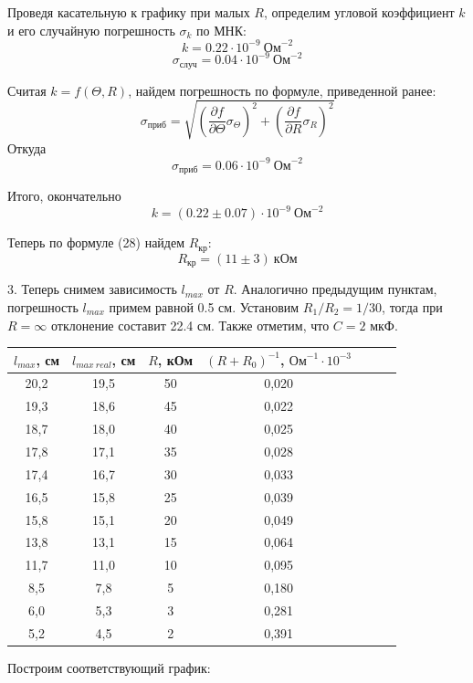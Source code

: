 \documentclass[14pt]{article}
\begin{document}
\vspace{1cm}
Проведя касательную к графику при малых $R$, определим угловой коэффициент $k$ и его случайную погрешность $\sigma_k$ по МНК:
$$
	k = 0.22 \cdot 10^{-9}~\text{Ом}^{-2}
$$
$$
	\sigma_{\text{случ}} = 0.04 \cdot 10^{-9}~\text{Ом}^{-2}
$$

Считая $k = f(\Theta, R)$, найдем погрешность по формуле, приведенной ранее:
$$
	\sigma_{\text{приб}} = \sqrt{\left(\frac{\partial f}{\partial \Theta}\sigma_\Theta\right)^2 + \left(\frac{\partial f}{\partial R}\sigma_R\right)^2}
$$
Откуда
$$
	\sigma_{\text{приб}} = 0.06 \cdot 10^{-9}~\text{Ом}^{-2}
$$

Итого, окончательно
$$
	k = (0.22 \pm 0.07) \cdot 10^{-9}~\text{Ом}^{-2}
$$

\vspace{1cm}
Теперь по формуле (28) найдем $R_\text{кр}$:
$$
	R_\text{кр} = (11 \pm 3)~\text{кОм}
$$

\vspace{1cm}
3. Теперь снимем зависимость $l_{max}$ от $R$. Аналогично предыдущим пунктам, погрешность $l_{max}$ примем равной 0.5 см. Установим $R_1/R_2 = 1/30$, тогда при $R = \infty$ отклонение составит 22.4 см. Также отметим, что $C = 2$ мкФ.

\begin{center}
\begin{tabular}{|c|c|c|c|c|c|c|}
\hline
$l_{max}$, см&$l_{max~real}$, см&$R$, кОм&$(R+R_0)^{-1}$, $\text{Ом}^{-1}\cdot10^{-3}$\\
\hline
20,2&19,5&50&0,020\\
\hline
19,3&18,6&45&0,022\\
\hline
18,7&18,0&40&0,025\\
\hline
17,8&17,1&35&0,028\\
\hline
17,4&16,7&30&0,033\\
\hline
16,5&15,8&25&0,039\\
\hline
15,8&15,1&20&0,049\\
\hline
13,8&13,1&15&0,064\\
\hline
11,7&11,0&10&0,095\\
\hline
8,5&7,8&5&0,180\\
\hline
6,0&5,3&3&0,281\\
\hline
5,2&4,5&2&0,391\\
\hline
\end{tabular}
\end{center}

Построим соответствующий график:
\end{document}
